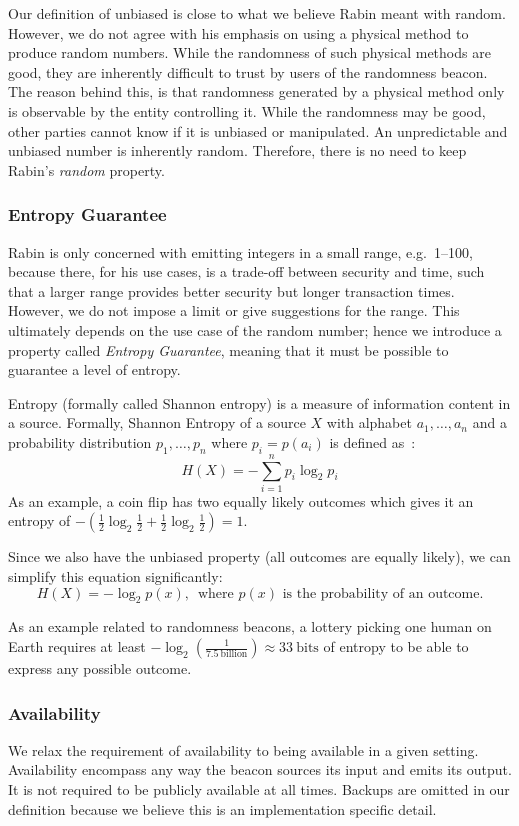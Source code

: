 Our definition of unbiased is close to what we believe Rabin meant with random.
However, we do not agree with his emphasis on using a physical method to produce random numbers.
While the randomness of such physical methods are good, they are inherently difficult to trust by users of the randomness beacon.
The reason behind this, is that randomness generated by a physical method only is observable by the entity controlling it.
While the randomness may be good, other parties cannot know if it is unbiased or manipulated.
An unpredictable and unbiased number is inherently random. Therefore, there is no need to keep Rabin's \emph{random} property.

\subsubsection{Entropy Guarantee}
Rabin is only concerned with emitting integers in a small range, e.g.\ 1--100, because there, for his use cases, is a trade-off between security and time, such that a larger range provides better security but longer transaction times.
However, we do not impose a limit or give suggestions for the range.
This ultimately depends on the use case of the random number;
hence we introduce a property called \emph{Entropy Guarantee}, meaning that it must be possible to guarantee a level of entropy.

Entropy (formally called Shannon entropy) is a measure of information content in a source.
Formally, Shannon Entropy of a source $X$ with alphabet ${a_1, \ldots, a_n}$ and a probability distribution ${p_1, \ldots , p_n}$ where $p_i = p(a_i)$ is defined as~\cite{informationtheory}:
$$
H(X) = -\sum\limits_{i = 1}^n p_{i}\log_{2} p_{i}
$$
As an example, a coin flip has two equally likely outcomes which gives it an entropy of $-(\frac{1}{2}\log_2 \frac{1}{2} + \frac{1}{2}\log_2 \frac{1}{2}) = 1$.

Since we also have the unbiased property (all outcomes are equally likely), we can simplify this equation significantly:
$$
H(X) = -\log_{2}p(x)\text{,~~where }p(x)\text{ is the probability of an outcome.}
$$

As an example related to randomness beacons, a lottery picking one human on Earth requires at least $-\log_2(\frac{1}{7.5~\text{billion}}) \approx 33~\text{bits}$ of entropy to be able to express any possible outcome.

\subsubsection{Availability}
We relax the requirement of availability to being available in a given setting.
Availability encompass any way the beacon sources its input and emits its output.
It is not required to be publicly available at all times.
Backups are omitted in our definition because we believe this is an implementation specific detail.

